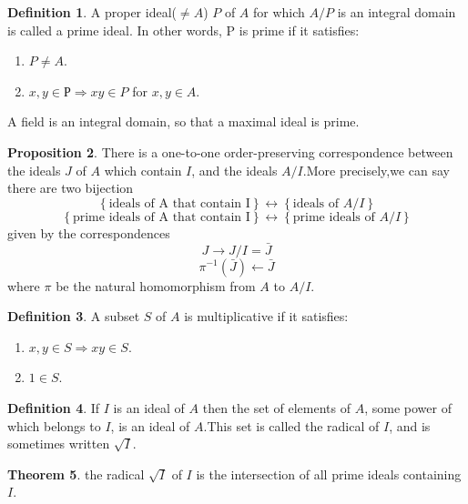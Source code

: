 \documentclass[a4paper,12pt]{article}
\newcommand{\bbrace}[1]{\left\{ #1 \right\} }
\theoremstyle{definition}
\newtheorem{defn}{Definition}[subsection]
\newtheorem{theo}[defn]{Theorem}
\newtheorem{prop}[defn]{Proposition}
\begin{document}
\begin{defn}
    A proper ideal($\neq A$) $P$ of $A$ for which $A/P $ is an integral domain is called a prime
    ideal. In other words, P is prime if it satisfies:
    \begin{enumerate}[(1)]
        \item $ P\neq A$.
        \item $x,y \in Р \Rightarrow xy \in P$ for $x,y\in A$.
    \end{enumerate}
    A field is an integral domain, so that a maximal ideal is prime.
\end{defn}
\begin{prop}
    There is a one-to-one order-preserving correspondence
    between the ideals $J$ of $A$ which contain $I$, and the ideals $A/I$.More precisely,we can say
    there are two bijection
    \begin{equation*}
        \bbrace{\text{ideals of A that contain I}}\longleftrightarrow \bbrace{\text{ideals of } A/I}
    \end{equation*}
    \begin{equation*}
        \bbrace{\text{prime ideals of A that contain I}}\longleftrightarrow \bbrace{\text{prime ideals of } A/I}
    \end{equation*}
    given by the correspondences
    \begin{equation*}
        J  \longrightarrow  J/I=\bar{J}
    \end{equation*}
    \begin{equation*}
        \pi^{-1}(\bar{J})  \longleftarrow \bar{J}
    \end{equation*}
    where $\pi$ be the natural homomorphism from $A$ to $A/I$.
\end{prop}
\begin{defn}
    A subset $S$ of $A$ is multiplicative if it satisfies:
    \begin{enumerate}[(1)]
        \item $x,y\in S \Rightarrow xy \in S$.
        \item $1 \in S$.
    \end{enumerate}
\end{defn}
\begin{defn}
    If $I$ is an ideal of $A$ then the set of elements of $A$, some power of which
    belongs to $I$, is an ideal of $A$.This set is called the radical of $I$, and is sometimes written $\sqrt{I}$.
\end{defn}
\begin{theo}
    the radical $\sqrt{I}$ of $I$ is the intersection of all prime ideals containing $I$.
\end{theo}
\end{document}
